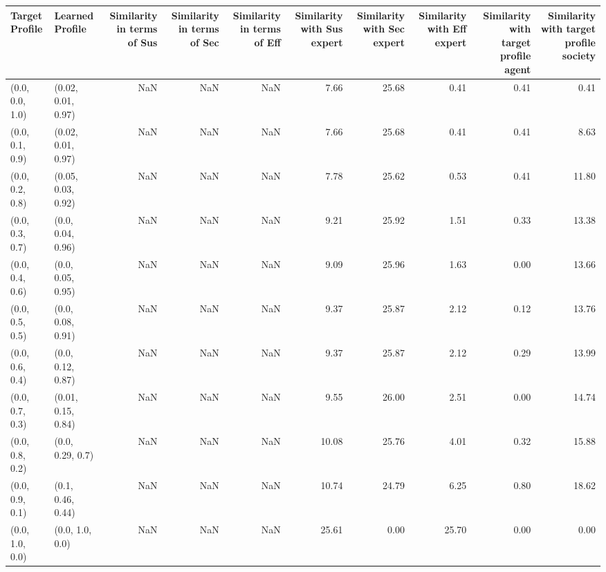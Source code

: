 \begin{tabular}{llrrrrrrrr}
\toprule
Target Profile & Learned Profile & Similarity in terms of Sus & Similarity in terms of Sec & Similarity in terms of Eff & Similarity with Sus expert & Similarity with Sec expert & Similarity with Eff expert & Similarity with target profile agent & Similarity with target profile society \\
\midrule
(0.0, 0.0, 1.0) & (0.02, 0.01, 0.97) & NaN & NaN & NaN & 7.66 & 25.68 & 0.41 & 0.41 & 0.41 \\
(0.0, 0.1, 0.9) & (0.02, 0.01, 0.97) & NaN & NaN & NaN & 7.66 & 25.68 & 0.41 & 0.41 & 8.63 \\
(0.0, 0.2, 0.8) & (0.05, 0.03, 0.92) & NaN & NaN & NaN & 7.78 & 25.62 & 0.53 & 0.41 & 11.80 \\
(0.0, 0.3, 0.7) & (0.0, 0.04, 0.96) & NaN & NaN & NaN & 9.21 & 25.92 & 1.51 & 0.33 & 13.38 \\
(0.0, 0.4, 0.6) & (0.0, 0.05, 0.95) & NaN & NaN & NaN & 9.09 & 25.96 & 1.63 & 0.00 & 13.66 \\
(0.0, 0.5, 0.5) & (0.0, 0.08, 0.91) & NaN & NaN & NaN & 9.37 & 25.87 & 2.12 & 0.12 & 13.76 \\
(0.0, 0.6, 0.4) & (0.0, 0.12, 0.87) & NaN & NaN & NaN & 9.37 & 25.87 & 2.12 & 0.29 & 13.99 \\
(0.0, 0.7, 0.3) & (0.01, 0.15, 0.84) & NaN & NaN & NaN & 9.55 & 26.00 & 2.51 & 0.00 & 14.74 \\
(0.0, 0.8, 0.2) & (0.0, 0.29, 0.7) & NaN & NaN & NaN & 10.08 & 25.76 & 4.01 & 0.32 & 15.88 \\
(0.0, 0.9, 0.1) & (0.1, 0.46, 0.44) & NaN & NaN & NaN & 10.74 & 24.79 & 6.25 & 0.80 & 18.62 \\
(0.0, 1.0, 0.0) & (0.0, 1.0, 0.0) & NaN & NaN & NaN & 25.61 & 0.00 & 25.70 & 0.00 & 0.00 \\
\bottomrule
\end{tabular}
